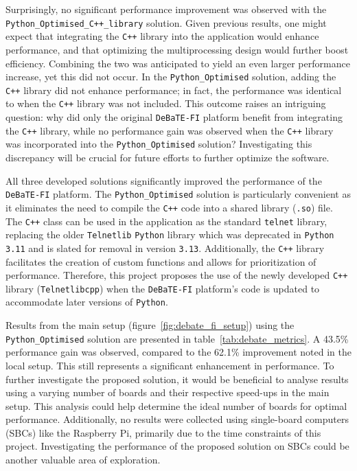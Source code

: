 Surprisingly, no significant performance improvement was observed with the \texttt{Python\_Optimised\_C++\_library} solution. Given previous results, one might expect that integrating the \texttt{C++} library into the application would enhance performance, and that optimizing the multiprocessing design would further boost efficiency. Combining the two was anticipated to yield an even larger performance increase, yet this did not occur. In the \texttt{Python\_Optimised} solution, adding the \texttt{C++} library did not enhance performance; in fact, the performance was identical to when the \texttt{C++} library was not included. This outcome raises an intriguing question: why did only the original \texttt{DeBaTE-FI} platform benefit from integrating the \texttt{C++} library, while no performance gain was observed when the \texttt{C++} library was incorporated into the \texttt{Python\_Optimised} solution? Investigating this discrepancy will be crucial for future efforts to further optimize the software.

All three developed solutions significantly improved the performance of the \texttt{DeBaTE-FI} platform. The \texttt{Python\_Optimised} solution is particularly convenient as it eliminates the need to compile the \texttt{C++} code into a shared library (\texttt{.so}) file. The \texttt{C++} class can be used in the application as the standard \texttt{telnet} library, replacing the older \texttt{Telnetlib} \texttt{Python} library which was deprecated in \texttt{Python 3.11} and is slated for removal in version \texttt{3.13}\cite{PythonTelnetlib}. Additionally, the \texttt{C++} library facilitates the creation of custom functions and allows for prioritization of performance. Therefore, this project proposes the use of the newly developed \texttt{C++} library (\texttt{Telnetlibcpp}) when the \texttt{DeBaTE-FI} platform's code is updated to accommodate later versions of \texttt{Python}.

Results from the main setup (figure~\ref{fig:debate_fi_setup}) using the \texttt{Python\_Optimised} solution are presented in table~\ref{tab:debate_metrics}. A 43.5\% performance gain was observed, compared to the 62.1\% improvement noted in the local setup. This still represents a significant enhancement in performance. To further investigate the proposed solution, it would be beneficial to analyse results using a varying number of boards and their respective speed-ups in the main setup. This analysis could help determine the ideal number of boards for optimal performance. Additionally, no results were collected using single-board computers (SBCs) like the Raspberry Pi, primarily due to the time constraints of this project. Investigating the performance of the proposed solution on SBCs could be another valuable area of exploration.


